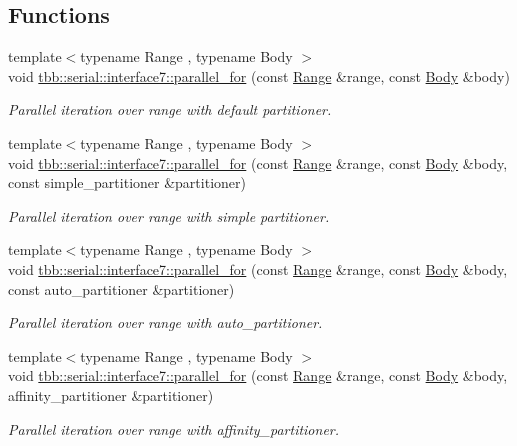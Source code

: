 \subsection*{Functions}
\begin{DoxyCompactItemize}
\item 
{\footnotesize template$<$typename Range , typename Body $>$ }\\void \hyperlink{group__algorithms_ga0024c0599cca16cd233bdefcac9694b3}{tbb\+::serial\+::interface7\+::parallel\+\_\+for} (const \hyperlink{classtbb_1_1blocked__range}{Range} \&range, const \hyperlink{classBody}{Body} \&body)
\begin{DoxyCompactList}\small\item\em Parallel iteration over range with default partitioner. \end{DoxyCompactList}\item 
{\footnotesize template$<$typename Range , typename Body $>$ }\\void \hyperlink{group__algorithms_gaa260f10cf33f439578bc34a121a153b3}{tbb\+::serial\+::interface7\+::parallel\+\_\+for} (const \hyperlink{classtbb_1_1blocked__range}{Range} \&range, const \hyperlink{classBody}{Body} \&body, const simple\+\_\+partitioner \&partitioner)
\begin{DoxyCompactList}\small\item\em Parallel iteration over range with simple partitioner. \end{DoxyCompactList}\item 
{\footnotesize template$<$typename Range , typename Body $>$ }\\void \hyperlink{group__algorithms_gaa9fb1746bb0983657df9ee0113ec11e6}{tbb\+::serial\+::interface7\+::parallel\+\_\+for} (const \hyperlink{classtbb_1_1blocked__range}{Range} \&range, const \hyperlink{classBody}{Body} \&body, const auto\+\_\+partitioner \&partitioner)
\begin{DoxyCompactList}\small\item\em Parallel iteration over range with auto\+\_\+partitioner. \end{DoxyCompactList}\item 
{\footnotesize template$<$typename Range , typename Body $>$ }\\void \hyperlink{group__algorithms_ga056d69c05d1a56042cdbbdd39119be8f}{tbb\+::serial\+::interface7\+::parallel\+\_\+for} (const \hyperlink{classtbb_1_1blocked__range}{Range} \&range, const \hyperlink{classBody}{Body} \&body, affinity\+\_\+partitioner \&partitioner)
\begin{DoxyCompactList}\small\item\em Parallel iteration over range with affinity\+\_\+partitioner. \end{DoxyCompactList}\end{DoxyCompactItemize}

